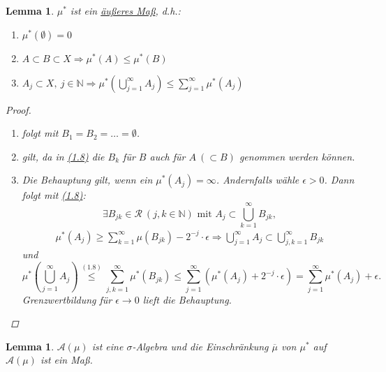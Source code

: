 \documentclass[a4paper]{report}
\newcommand{\N}{\mathbb{N}}
\newcommand{\jlabel}[1]{\label{j_#1}}
\newcommand{\jhyperref}[2]{\hyperref[j_#1]{#2}}
\newcommand{\jlink}[1]{\jhyperref{#1}{#1}}
\theoremstyle{plain}
\newtheorem{lem}[thm]{Lemma}
\theoremstyle{definition}
\begin{document}
{{{\begin{lem}
\jlabel{Lem 1.22}
    $\mu^*$ ist ein \uline{äußeres Maß}, d.h.:
    \begin{enumerate}
        \item $\mu^*(\emptyset) = 0$
        \item $A\subset B \subset X \Rightarrow \mu^*(A) \le \mu^*(B)$
        \item $A_j \subset X, \ j\in\N \Rightarrow \mu^*\left(\bigcup_{j=1}^\infty A_j \right) \le \sum_{j=1}^\infty \mu^*(A_j)$
    \end{enumerate}
    \begin{proof}
        \begin{enumerate}
            \item folgt mit $B_1 = B_2 = \dots = \emptyset$.
            \item gilt, da in \jlink{(1.8)} die $B_k$ für $B$ auch für $A\ (\subset B)$ genommen werden können.
            \item Die Behauptung gilt, wenn ein $\mu^*(A_j)=\infty$. Andernfalls wähle $\epsilon>0$. Dann folgt mit \jlink{(1.8)}: 
            \begin{displaymath}
                \exists B_{jk} \in \mathcal{R} \ (j,k \in \N)\text{ mit }A_j \subset \bigcup_{k=1}^\infty B_{jk},
            \end{displaymath}
            \begin{displaymath}
                \begin{split}
                    \mu^*(A_j) \ge \sum_{k=1}^\infty \mu(B_{jk}) -2^{-j}\cdot \epsilon \Rightarrow \bigcup_{j=1}^\infty A_j \subset \bigcup_{j,k=1}^\infty B_{jk}
                \end{split}
            \end{displaymath}
            und
            \begin{displaymath}
                \mu^*(\bigcup_{j=1}^\infty A_j) \overset{\jlink{(1.8)}}{\le} \sum_{j,k=1}^\infty \mu^*(B_{jk}) \le \sum_{j=1}^\infty (\mu^*(A_j) + 2^{-j}\cdot \epsilon) = \sum_{j=1}^\infty \mu^*(A_j) + \epsilon.
            \end{displaymath}
            Grenzwertbildung für $\epsilon \rightarrow 0$ lieft die Behauptung.
        \end{enumerate}
    \end{proof}
\end{lem}

\begin{lem}
\jlabel{Lem 1.23}
    $\mathcal{A}(\mu)$ ist eine $\sigma$-Algebra und die Einschränkung $\overline{\mu}$ von $\mu^*$ auf $\mathcal{A}(\mu)$ ist ein Maß.
\end{lem}

}}}
\end{document}
